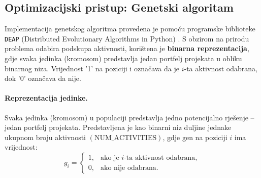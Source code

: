 \subsection{Optimizacijski pristup: Genetski algoritam}

Implementacija genetskog algoritma provedena je pomoću programske biblioteke \texttt{DEAP} (Distributed Evolutionary Algorithms in Python) \cite{DEAP2012}. 
S obzirom na prirodu problema odabira podskupa aktivnosti, korištena je \textbf{binarna reprezentacija}, gdje svaka jedinka (kromosom) predstavlja jedan portfelj projekata u obliku binarnog niza. Vrijednost '1' na poziciji i označava da je $i$-ta aktivnost odabrana, dok '0' označava da nije.
\paragraph{Reprezentacija jedinke.}
Svaka jedinka (kromosom) u populaciji predstavlja jedno potencijalno rješenje – jedan portfelj projekata. 
Predstavljena je kao binarni niz duljine jednake ukupnom broju aktivnosti $(\text{NUM\_ACTIVITIES})$, gdje gen na poziciji $i$ ima vrijednost:
\[
g_i =
\begin{cases}
1, & \text{ako je $i$-ta aktivnost odabrana}, \\
0, & \text{ako nije odabrana}.
\end{cases}
\]

